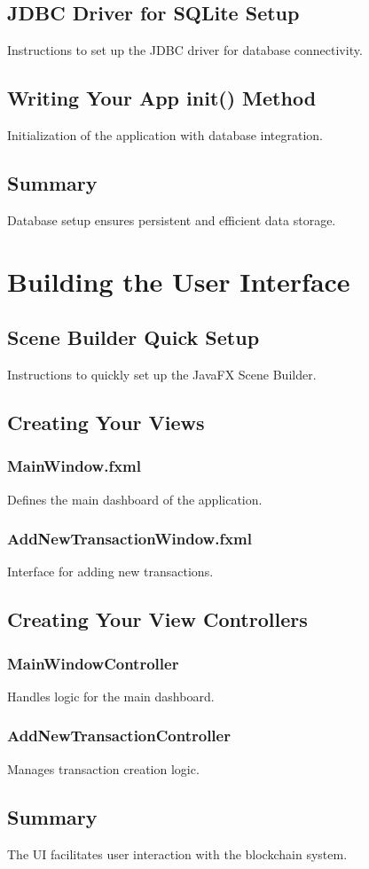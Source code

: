 \documentclass[12pt,a4paper]{report}
\begin{document}
\section{JDBC Driver for SQLite Setup}
Instructions to set up the JDBC driver for database connectivity.
\section{Writing Your App init() Method}
Initialization of the application with database integration.
\section{Summary}
Database setup ensures persistent and efficient data storage.

\chapter{Building the User Interface}
\section{Scene Builder Quick Setup}
Instructions to quickly set up the JavaFX Scene Builder.
\section{Creating Your Views}
\subsection{MainWindow.fxml}
Defines the main dashboard of the application.
\subsection{AddNewTransactionWindow.fxml}
Interface for adding new transactions.
\section{Creating Your View Controllers}
\subsection{MainWindowController}
Handles logic for the main dashboard.
\subsection{AddNewTransactionController}
Manages transaction creation logic.
\section{Summary}
The UI facilitates user interaction with the blockchain system.
\end{document}
